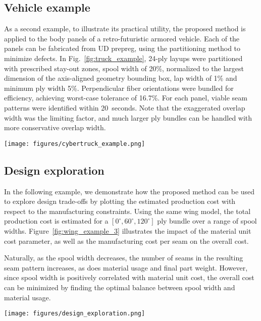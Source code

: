 \subsection{Vehicle example}
As a second example, to illustrate its practical utility, the proposed method is applied to the body panels of a retro-futuristic armored vehicle. Each of the panels can be fabricated from UD prepreg, using the partitioning method to minimize defects. In Fig.~\ref{fig:truck_example}, 24-ply layups were partitioned with prescribed stay-out zones, spool width of 20\%, normalized to the largest dimension of the axis-aligned geometry bounding box, lap width of 1\% and minimum ply width 5\%. Perpendicular fiber orientations were bundled for efficiency, achieving worst-case tolerance of 16.7\%. For each panel, viable seam patterns were identified within 20~seconds. Note that the exaggerated overlap width was the limiting factor, and much larger ply bundles can be handled with more conservative overlap width.
\begin{figure*}[h]
    \centering
    \texttt{[image: figures/cybertruck\_example.png]}
    \caption{Retro futuristic armored vehicle body panels and their respective seam patters for two-orientation ply bundles.}
    \label{fig:truck_example}
\end{figure*}

\subsection{Design exploration}
In the following example, we demonstrate how the proposed method can be used to explore design trade-offs by plotting the estimated production cost with respect to the manufacturing constraints. Using the same wing model, the total production cost is estimated for a $[0^{\circ}, 60^{\circ}, 120^{\circ}]$ ply bundle over a range of spool widths. Figure~\ref{fig:wing_example_3} illustrates the impact of the material unit cost parameter, as well as the manufacturing cost per seam on the overall cost. 

Naturally, as the spool width decreases, the number of seams in the resulting seam pattern increases, as does material usage and final part weight. However, since spool width is positively correlated with material unit cost, the overall cost can be minimized by finding the optimal balance between spool width and material usage. 

\begin{figure*}[t]
    \centering
    \texttt{[image: figures/design\_exploration.png]}
    \caption{Estimated production cost as a function of spool width. In each plot, $\hat{a} = 5.0$, $\hat{b} = 1.0$, and $\hat{c}_{seam} = 0.01$ unless otherwise specified.}
    \label{fig:wing_example_3}
\end{figure*}

